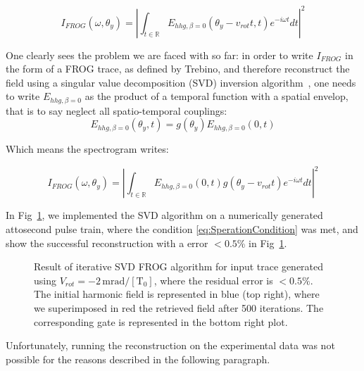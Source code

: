 \begin{equation}
\label{eq:equationFrogAtto}
I_{FROG}(\omega,\theta_y) = |\int_{t\in \mathbb{R}}E_{hhg,\beta=0}(\theta_y-v_{rot} t,t)e^{-i\omega t}dt|^2
\end{equation}

\noindent One clearly sees the problem we are faced with so far: in order to write $I_{FROG}$ in the form of a FROG trace, as defined by Trebino, and therefore reconstruct the field using a singular value decomposition (SVD) inversion algorithm~\cite{Kane2008}, one needs to write $E_{hhg,\beta=0}$ as the product of a temporal function with a spatial envelop, that is to say neglect all spatio-temporal couplings:
\begin{equation}
\label{eq:SperationCondition}
E_{hhg,\beta=0}(\theta_y,t)= g(\theta_y) E_{hhg,\beta=0}(0,t)
\end{equation}

\noindent Which means the spectrogram writes:

\begin{equation}
\label{eq:equationFrogAtto2}
I_{FROG}(\omega,\theta_y) = |\int_{t\in \mathbb{R}}E_{hhg,\beta=0}(0,t)g(\theta_y-v_{rot} t)e^{-i\omega t}dt|^2
\end{equation}



\noindent In Fig~\ref{fig:generatedField}, we implemented the SVD algorithm on a numerically generated attosecond pulse train, where the condition \ref{eq:SperationCondition} was met, and show the successful reconstruction with a error $<0.5$\% in Fig~\ref{fig:generatedField}.


\begin{figure}[H]
\caption{\label{fig:generatedField} Result of iterative SVD FROG algorithm for input trace generated using $V_{rot} = -2 \,\mathrm{mrad/[T_0]}$, where the residual error is $<0.5\%$. The initial harmonic field is represented in blue (top right), where we superimposed in red the retrieved field after 500 iterations. The corresponding gate is represented in the bottom right plot.}
\end{figure}

\noindent Unfortunately, running the reconstruction on the experimental data was not possible for the reasons described in the following paragraph. \\

\noindent {}

